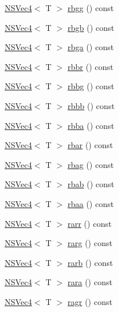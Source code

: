 \begin{DoxyCompactItemize}
\item 
\hyperlink{structNSVec4}{N\-S\-Vec4}$<$ T $>$ \hyperlink{structNSVec4_aeb7eb6595ad95a4bf883c92023eb3241}{rbgg} () const 
\item 
\hyperlink{structNSVec4}{N\-S\-Vec4}$<$ T $>$ \hyperlink{structNSVec4_a283e658b8de504d1b22735b8910376bb}{rbgb} () const 
\item 
\hyperlink{structNSVec4}{N\-S\-Vec4}$<$ T $>$ \hyperlink{structNSVec4_a9ee3ffffb3308b469680e7906a86da45}{rbga} () const 
\item 
\hyperlink{structNSVec4}{N\-S\-Vec4}$<$ T $>$ \hyperlink{structNSVec4_aa9d8f9693916ae57a3e78c29b53eedb4}{rbbr} () const 
\item 
\hyperlink{structNSVec4}{N\-S\-Vec4}$<$ T $>$ \hyperlink{structNSVec4_ae744cfbc9d85f5f8b227bba9695834bd}{rbbg} () const 
\item 
\hyperlink{structNSVec4}{N\-S\-Vec4}$<$ T $>$ \hyperlink{structNSVec4_a89e32eae50b13f611b42fedcb30324e6}{rbbb} () const 
\item 
\hyperlink{structNSVec4}{N\-S\-Vec4}$<$ T $>$ \hyperlink{structNSVec4_ae6f0111ba0499ecb14e096c67e6aa91b}{rbba} () const 
\item 
\hyperlink{structNSVec4}{N\-S\-Vec4}$<$ T $>$ \hyperlink{structNSVec4_aace3725781a0352933402248d43bfa4b}{rbar} () const 
\item 
\hyperlink{structNSVec4}{N\-S\-Vec4}$<$ T $>$ \hyperlink{structNSVec4_a211066db336abe230a201c3314bc1cd4}{rbag} () const 
\item 
\hyperlink{structNSVec4}{N\-S\-Vec4}$<$ T $>$ \hyperlink{structNSVec4_ae3638be3dfe104e62e1201fa7e508226}{rbab} () const 
\item 
\hyperlink{structNSVec4}{N\-S\-Vec4}$<$ T $>$ \hyperlink{structNSVec4_a00aba70391f6e8ad3a79715d1f919de7}{rbaa} () const 
\item 
\hyperlink{structNSVec4}{N\-S\-Vec4}$<$ T $>$ \hyperlink{structNSVec4_aab220d975fffe8fb4d0239539c3ff484}{rarr} () const 
\item 
\hyperlink{structNSVec4}{N\-S\-Vec4}$<$ T $>$ \hyperlink{structNSVec4_a2ca891225698788e989203d55f257277}{rarg} () const 
\item 
\hyperlink{structNSVec4}{N\-S\-Vec4}$<$ T $>$ \hyperlink{structNSVec4_a6b6608e8a30daa61c80eea955710886a}{rarb} () const 
\item 
\hyperlink{structNSVec4}{N\-S\-Vec4}$<$ T $>$ \hyperlink{structNSVec4_a4b289c978ef21901ba905dcf28593673}{rara} () const 
\item 
\hyperlink{structNSVec4}{N\-S\-Vec4}$<$ T $>$ \hyperlink{structNSVec4_a09552db3dcb273963d0cecf5b2435ac5}{ragr} () const 

\end{DoxyCompactItemize}
